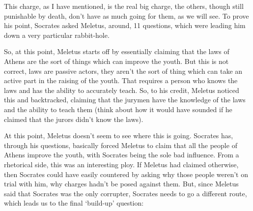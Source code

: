 This charge, as I have mentioned, is the real big charge, the others, though still punishable by death, don't have as much going for them, as we will see. To prove his point, Socrates asked Meletus, around, 11 questions, which were leading him down a very particular rabbit-hole.

So, at this point, Meletus starts off by essentially claiming that the laws of Athens are the sort of things which can improve the youth. But this is not correct, laws are passive actors, they aren't the sort of thing which can take an active part in the raising of the youth. That requires a person who knows the laws and has the ability to accurately teach. So, to his credit, Meletus noticed this and backtracked, claiming that the jurymen have the knowledge of the laws and the ability to teach them (think about how it would have sounded if he claimed that the jurors didn't know the laws).

At this point, Meletus doesn't seem to see where this is going. Socrates has, through his questions, basically forced Meletus to claim that all the people of Athens improve the youth, with Socrates being the sole bad influence. From a rhetorical side, this was an interesting ploy. If Meletus had claimed otherwise, then Socrates could have easily countered by asking why those people weren't on trial with him, why charges hadn't be posed against them. But, since Meletus said that Socrates was the only corrupter, Socrates needs to go a different route, which leads us to the final `build-up' question:

